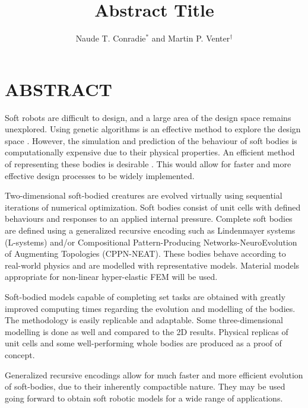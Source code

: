 \documentclass[a4paper]{sacam2020}
\title{Abstract Title}
\author{Naude T. Conradie$^{*}$ and Martin P. Venter$^{\dag}$}
\begin{document}
\thispagestyle{empty}

\section*{ABSTRACT}

Soft robots are difficult to design, and a large area of the design space remains unexplored. Using genetic algorithms is an effective method to explore the design space \cite{Sims1994a}. However, the simulation and prediction of the behaviour of soft bodies is computationally expensive due to their physical properties. An efficient method of representing these bodies is desirable \cite{Hiller2010}. This would allow for faster and more effective design processes to be widely implemented.

Two-dimensional soft-bodied creatures are evolved virtually using sequential iterations of numerical optimization. Soft bodies consist of unit cells with defined behaviours and responses to an applied internal pressure. Complete soft bodies are defined using a generalized recursive encoding such as Lindenmayer systems (L-systems) and/or Compositional Pattern-Producing Networks-NeuroEvolution of Augmenting Topologies (CPPN-NEAT). These bodies behave according to real-world physics and are modelled with representative models. Material models appropriate for non-linear hyper-elastic FEM will be used.

Soft-bodied models capable of completing set tasks are obtained with greatly improved computing times regarding the evolution and modelling of the bodies. The methodology is easily replicable and adaptable. Some three-dimensional modelling is done as well and compared to the 2D results. Physical replicas of unit cells and some well-performing whole bodies are produced as a proof of concept.

Generalized recursive encodings allow for much faster and more efficient evolution of soft-bodies, due to their inherently compactible nature. They may be used going forward to obtain soft robotic models for a wide range of applications.



\end{document}
